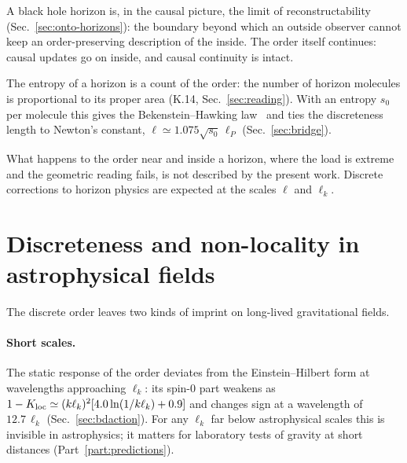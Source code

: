 A black hole horizon is, in the causal picture, the limit of reconstructability
(Sec.~\ref{sec:onto-horizons}): the boundary beyond which an outside observer cannot keep an
order-preserving description of the inside. The order itself continues: causal updates go on inside,
and causal continuity is intact. 

The entropy of a horizon is a count of the order: the number of horizon molecules is proportional to its
proper area (K.14, Sec.~\ref{sec:reading}). With an entropy $s_0$ per molecule this gives the Bekenstein--Hawking law~\cite{Bekenstein1973,Hawking1975} and ties the discreteness length to Newton's
constant, $\ell\simeq1.075\sqrt{s_0}\,\ell_P$ (Sec.~\ref{sec:bridge}). 

What happens to the order near and inside a horizon, where the load is extreme and the geometric
reading fails, is not described by the present work. Discrete corrections to horizon physics are
expected at the scales $\ell$ and $\ell_k$. 

\section{Discreteness and non-locality in astrophysical fields}\label{sec:astro-nonlocal}

The discrete order leaves two kinds of imprint on long-lived gravitational fields.

\paragraph{Short scales.} The static response of the order deviates from the Einstein--Hilbert form at
wavelengths approaching $\ell_k$: its spin-0 part weakens as
$1-K_{\rm loc}\simeq(k\ell_k)^2[4.0\ln(1/k\ell_k)+0.9]$ and changes sign at a wavelength of
$12.7\,\ell_k$ (Sec.~\ref{sec:bdaction}). For any $\ell_k$ far below astrophysical scales this is
invisible in astrophysics; it matters for laboratory tests of gravity at short distances
(Part~\ref{part:predictions}).

